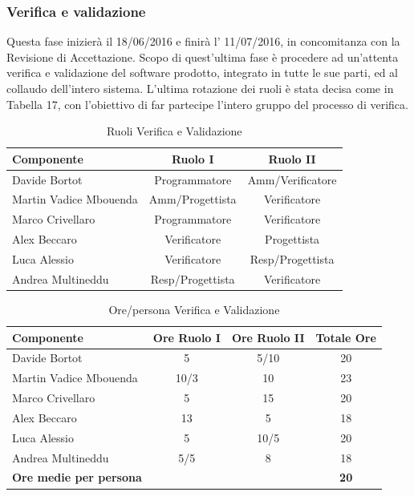 \documentclass[a4paper,11pt]{article}
\begin{document}
		\subsubsection{Verifica e validazione}
		Questa fase inizierà il 18/06/2016 e finirà l' 11/07/2016, in concomitanza con la Revisione di Accettazione. Scopo di quest'ultima fase è procedere ad un'attenta verifica e validazione del software prodotto, integrato in tutte le sue parti, ed al collaudo dell'intero sistema. L'ultima rotazione dei ruoli è stata decisa come in Tabella 17, con l'obiettivo di far partecipe l'intero gruppo del processo di verifica.
		\begin{table}[h!]			
		\begin{center}
			\begin{tabular}{l c c}
			\textbf{Componente} & \textbf{Ruolo I} & \textbf{Ruolo II} \\
			\midrule
			Davide Bortot & Programmatore & Amm/Verificatore\\
			Martin Vadice Mbouenda & Amm/Progettista & Verificatore\\
			Marco Crivellaro & Programmatore & Verificatore\\
			Alex Beccaro & Verificatore & Progettista\\
			Luca Alessio & Verificatore & Resp/Progettista\\
			Andrea Multineddu & Resp/Progettista & Verificatore\\
			\midrule
			\end{tabular}
		\end{center}
		\caption{Ruoli Verifica e Validazione}
		\end{table}
		\begin{table}[h]			
		\begin{center}
			\begin{tabular}{l c c c}
			\textbf{Componente} & \textbf{Ore Ruolo I} & \textbf{Ore Ruolo II} & \textbf{Totale Ore}\\
			\midrule
			Davide Bortot & 5 & 5/10 & 20\\
			Martin Vadice Mbouenda & 10/3 & 10 & 23\\
			Marco Crivellaro & 5 & 15 & 20 \\
			Alex Beccaro & 13 & 5 & 18\\
			Luca Alessio & 5 & 10/5 & 20\\
			Andrea Multineddu & 5/5 & 8 & 18\\
			\midrule
			\textbf{Ore medie per persona} & & & \textbf{20}\\
			\end{tabular}
		\end{center}
		\caption{Ore/persona Verifica e Validazione}
		\end{table}
		
\end{document}
